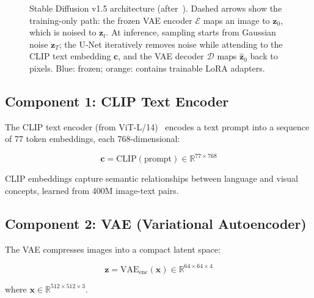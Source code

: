 \documentclass[11pt]{article}
\begin{document}
\begin{figure}[!htbp]
\caption{Stable Diffusion v1.5 architecture (after~\cite{rombach2021high}). Dashed arrows show the training-only path: the frozen VAE encoder $\mathcal{E}$ maps an image to $\mathbf{z}_0$, which is noised to $\mathbf{z}_t$. At inference, sampling starts from Gaussian noise $\mathbf{z}_T$; the U-Net iteratively removes noise while attending to the CLIP text embedding $\mathbf{c}$, and the VAE decoder $\mathcal{D}$ maps $\hat{\mathbf{z}}_0$ back to pixels. Blue: frozen; orange: contains trainable LoRA adapters.}
\label{fig:sd_architecture}
\end{figure}

\subsection{Component 1: CLIP Text Encoder}

The CLIP text encoder (from ViT-L/14)~\cite{radford2021learning} encodes a text prompt into a sequence of 77 token embeddings, each 768-dimensional:

\begin{equation}
\mathbf{c} = \text{CLIP}(\text{prompt}) \in \mathbb{R}^{77 \times 768}
\end{equation}

CLIP embeddings capture semantic relationships between language and visual concepts, learned from 400M image-text pairs.

\subsection{Component 2: VAE (Variational Autoencoder)}

The VAE compresses images into a compact latent space:

\begin{equation}
\mathbf{z} = \text{VAE}_{\text{enc}}(\mathbf{x}) \in \mathbb{R}^{64 \times 64 \times 4}
\end{equation}

where $\mathbf{x} \in \mathbb{R}^{512 \times 512 \times 3}$.
\end{document}
